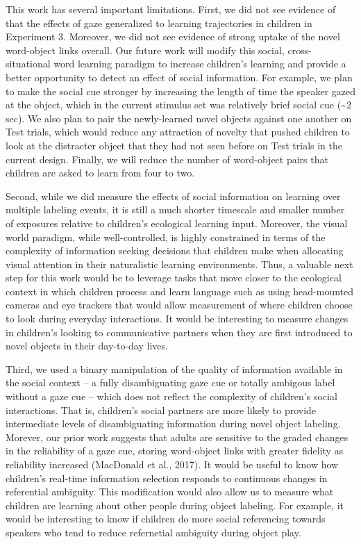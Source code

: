 \documentclass[man,floatsintext]{apa6}
\begin{document}
This work has several important limitations. First, we did not see
evidence of that the effects of gaze generalized to learning
trajectories in children in Experiment 3. Moreover, we did not see
evidence of strong uptake of the novel word-object links overall. Our
future work will modify this social, cross-situational word learning
paradigm to increase children's learning and provide a better
opportunity to detect an effect of social information. For example, we
plan to make the social cue stronger by increasing the length of time
the speaker gazed at the object, which in the current stimulus set was
relatively brief social cue (\textasciitilde{}2 sec). We also plan to
pair the newly-learned novel objects against one another on Test trials,
which would reduce any attraction of novelty that pushed children to
look at the distracter object that they had not seen before on Test
trials in the current design. Finally, we will reduce the number of
word-object pairs that children are asked to learn from four to two.

Second, while we did measure the effects of social information on
learning over multiple labeling events, it is still a much shorter
timescale and smaller number of exposures relative to children's
ecological learning input. Moreover, the visual world paradigm, while
well-controlled, is highly constrained in terms of the complexity of
information seeking decisions that children make when allocating visual
attention in their naturalistic learning environments. Thus, a valuable
next step for this work would be to leverage tasks that move closer to
the ecological context in which children process and learn language such
as using head-mounted cameras and eye trackers that would allow
measurement of where children choose to look during everyday
interactions. It would be interesting to measure changes in children's
looking to communicative partners when they are first introduced to
novel objects in their day-to-day lives.

Third, we used a binary manipulation of the quality of information
available in the social context -- a fully disambiguating gaze cue or
totally ambigous label without a gaze cue -- which does not reflect the
complexity of children's social interactions. That is, children's social
partners are more likely to provide intermediate levels of
disambiguating information during novel object labeling. Morever, our
prior work suggests that adults are sensitive to the graded changes in
the reliability of a gaze cue, storing word-object links with greater
fidelity as reliability increased (MacDonald et al., 2017). It would be
useful to know how children's real-time information selection responds
to continuous changes in referential ambiguity. This modification would
also allow us to measure what children are learning about other people
during object labeling. For example, it would be interesting to know if
children do more social referencing towards speakers who tend to reduce
refernetial ambiguity during object play.
\end{document}
